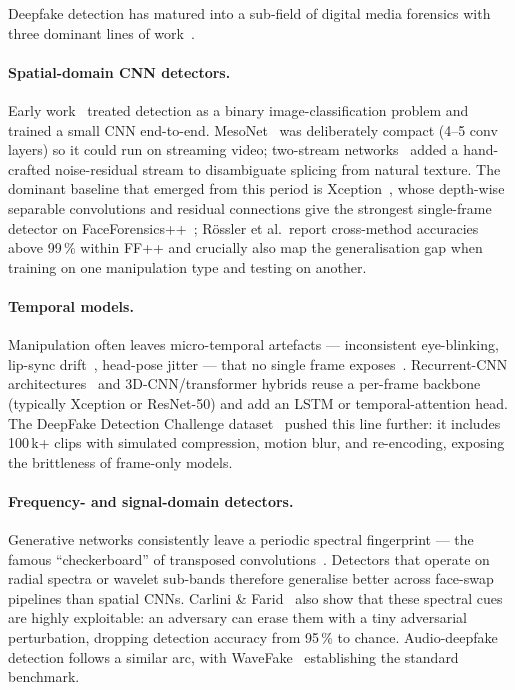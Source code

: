 \documentclass[11pt,a4paper]{article}
\theoremstyle{definition}
\theoremstyle{plain}
\theoremstyle{remark}
\begin{document}
Deepfake detection has matured into a sub-field of digital media
forensics with three dominant lines of work~\cite{bib3,bib21,bib50}.

\paragraph{Spatial-domain CNN detectors.}
Early work~\cite{bib24,bib25} treated detection as a binary
image-classification problem and trained a small CNN end-to-end.
MesoNet~\cite{bib24} was deliberately compact (4--5 conv layers) so it
could run on streaming video; two-stream networks~\cite{bib25} added a
hand-crafted noise-residual stream to disambiguate splicing from
natural texture. The dominant baseline that emerged from this period
is Xception~\cite{bib22}, whose depth-wise separable convolutions and
residual connections give the strongest single-frame detector on
FaceForensics++~\cite{bib5}; R\"ossler et al.\ report cross-method
accuracies above 99\,\% within FF++ and crucially also map the
generalisation gap when training on one manipulation type and testing
on another.

\paragraph{Temporal models.}
Manipulation often leaves micro-temporal artefacts --- inconsistent
eye-blinking, lip-sync drift~\cite{bib48}, head-pose jitter --- that
no single frame exposes~\cite{bib3}. Recurrent-CNN
architectures~\cite{bib26} and 3D-CNN/transformer hybrids reuse a
per-frame backbone (typically Xception or ResNet-50) and add an LSTM
or temporal-attention head. The DeepFake Detection Challenge
dataset~\cite{bib23} pushed this line further: it includes 100\,k+
clips with simulated compression, motion blur, and re-encoding,
exposing the brittleness of frame-only models.

\paragraph{Frequency- and signal-domain detectors.}
Generative networks consistently leave a periodic spectral fingerprint
--- the famous ``checkerboard'' of transposed convolutions~\cite{bib46}.
Detectors that operate on radial spectra or wavelet sub-bands
therefore generalise better across face-swap pipelines than spatial
CNNs. Carlini \& Farid~\cite{bib46} also show that these spectral
cues are highly exploitable: an adversary can erase them with a tiny
adversarial perturbation, dropping detection accuracy from 95\,\% to
chance. Audio-deepfake detection follows a similar arc, with
WaveFake~\cite{bib27} establishing the standard benchmark.
\end{document}

